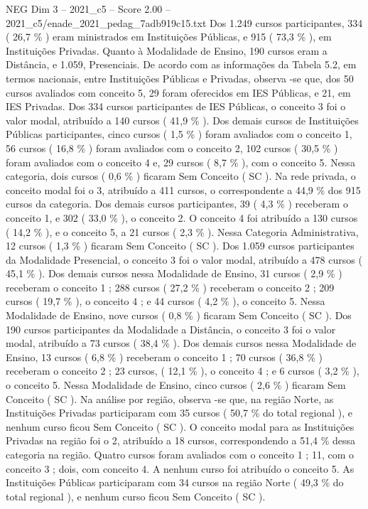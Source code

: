 \begin{textsample}{NEG Dim 3 – 2021\_c5 – Score 2.00 – 2021\_c5/enade\_2021\_pedag\_7adb919c15.txt}
Dos 1.249 cursos participantes, 334 ( 26,7 \% ) eram ministrados em Instituições Públicas, e 915 ( 73,3 \% ), em Instituições Privadas.
Quanto à Modalidade de Ensino, 190 cursos eram a Distância, e 1.059, Presenciais.
De acordo com as informações da Tabela 5.2, em termos nacionais, entre Instituições Públicas e Privadas, observa -se que, dos 50 cursos avaliados com conceito 5, 29 foram oferecidos em IES Públicas, e 21, em IES Privadas.
Dos 334 cursos participantes de IES Públicas, o conceito 3 foi o valor modal, atribuído a 140 cursos ( 41,9 \% ).
Dos demais cursos de Instituições Públicas participantes, cinco cursos ( 1,5 \% ) foram avaliados com o conceito 1, 56 cursos ( 16,8 \% ) foram avaliados com o conceito 2, 102 cursos ( 30,5 \% ) foram avaliados com o conceito 4 e, 29 cursos ( 8,7 \% ), com o conceito 5.
Nessa categoria, dois cursos ( 0,6 \% ) ficaram Sem Conceito ( SC ).
Na rede privada, o conceito modal foi o 3, atribuído a 411 cursos, o correspondente a 44,9 \% dos 915 cursos da categoria.
Dos demais cursos participantes, 39 ( 4,3 \% ) receberam o conceito 1, e 302 ( 33,0 \% ), o conceito 2.
O conceito 4 foi atribuído a 130 cursos ( 14,2 \% ), e o conceito 5, a 21 cursos ( 2,3 \% ).
Nessa Categoria Administrativa, 12 cursos ( 1,3 \% ) ficaram Sem Conceito ( SC ).
Dos 1.059 cursos participantes da Modalidade Presencial, o conceito 3 foi o valor modal, atribuído a 478 cursos ( 45,1 \% ).
Dos demais cursos nessa Modalidade de Ensino, 31 cursos ( 2,9 \% ) receberam o conceito 1 ; 288 cursos ( 27,2 \% ) receberam o conceito 2 ; 209 cursos ( 19,7 \% ), o conceito 4 ; e 44 cursos ( 4,2 \% ), o conceito 5.
Nessa Modalidade de Ensino, nove cursos ( 0,8 \% ) ficaram Sem Conceito ( SC ).
Dos 190 cursos participantes da Modalidade a Distância, o conceito 3 foi o valor modal, atribuído a 73 cursos ( 38,4 \% ).
Dos demais cursos nessa Modalidade de Ensino, 13 cursos ( 6,8 \% ) receberam o conceito 1 ; 70 cursos ( 36,8 \% ) receberam o conceito 2 ; 23 cursos, ( 12,1 \% ), o conceito 4 ; e 6 cursos ( 3,2 \% ), o conceito 5.
Nessa Modalidade de Ensino, cinco cursos ( 2,6 \% ) ficaram Sem Conceito ( SC ).
Na análise por região, observa -se que, na região Norte, as Instituições Privadas participaram com 35 cursos ( 50,7 \% do total regional ), e nenhum curso ficou Sem Conceito ( SC ).
O conceito modal para as Instituições Privadas na região foi o 2, atribuído a 18 cursos, correspondendo a 51,4 \% dessa categoria na região.
Quatro cursos foram avaliados com o conceito 1 ; 11, com o conceito 3 ; dois, com conceito 4.
A nenhum curso foi atribuído o conceito 5.
As Instituições Públicas participaram com 34 cursos na região Norte ( 49,3 \% do total regional ), e nenhum curso ficou Sem Conceito ( SC ).

\end{textsample}

